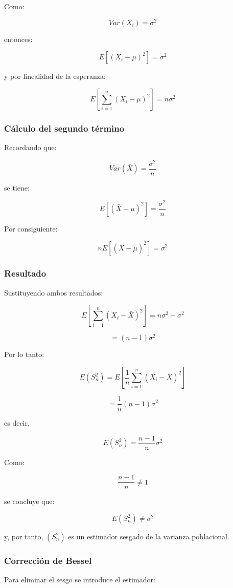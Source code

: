 \documentclass[
  11pt,
]{report}
\begin{document}
Como:

\[Var(X_i)=\sigma^2\]

entonces:

\[E[(X_i-\mu)^2]
=
\sigma^2\]

y por linealidad de la esperanza:

\[E\left[
\sum_{i=1}^{n}
(X_i-\mu)^2
\right]
=
n\sigma^2\]

\subsubsection{Cálculo del segundo
término}\label{cuxe1lculo-del-segundo-tuxe9rmino}

Recordando que:

\[Var(\bar X)
=
\frac{\sigma^2}{n}\]

se tiene:

\[E[(\bar X-\mu)^2]
=
\frac{\sigma^2}{n}\]

Por consiguiente:

\[nE[(\bar X-\mu)^2]
=
\sigma^2\]

\subsubsection{Resultado}\label{resultado}

Sustituyendo ambos resultados:

\[E\left[
\sum_{i=1}^{n}
(X_i-\bar X)^2
\right]
=
n\sigma^2-\sigma^2\]

\[=
(n-1)\sigma^2\]

Por lo tanto:

\[E(S_n^2)
=
E\left[
\frac{1}{n}
\sum_{i=1}^{n}
(X_i-\bar X)^2
\right]\]

\[=
\frac{1}{n}
(n-1)\sigma^2\]

es decir,

\[E(S_n^2)
=
\frac{n-1}{n}
\sigma^2\]

Como:

\[\frac{n-1}{n}
\neq
1\]

se concluye que:

\[E(S_n^2)
\neq
\sigma^2\]

y, por tanto, \((S_n^2)\) es un estimador sesgado de la varianza
poblacional.

\subsubsection{Corrección de Bessel}\label{correcciuxf3n-de-bessel}

Para eliminar el sesgo se introduce el estimador:
\end{document}
